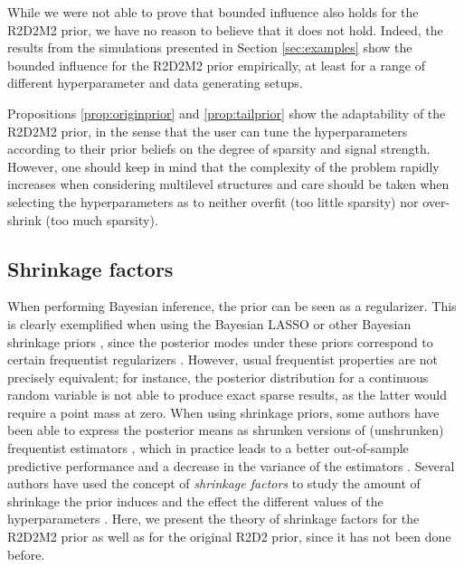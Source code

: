 While we were not able to prove that bounded influence also holds for the R2D2M2 prior, we have no reason to believe that it does not hold. Indeed, the results from the simulations presented in Section \ref{sec:examples} show the bounded influence for the R2D2M2 prior empirically, at least for a range of different hyperparameter and data generating setups.

Propositions \ref{prop:originprior} and \ref{prop:tailprior} show the adaptability of the R2D2M2 prior, in the sense that the user can tune the hyperparameters according to their prior beliefs on the degree of sparsity and signal strength. However, one should keep in mind that the complexity of the problem rapidly increases when considering multilevel structures and care should be taken when selecting the hyperparameters as to neither overfit (too little sparsity) nor over-shrink (too much sparsity).  \\

\subsection{Shrinkage factors}
\label{subsection:shrinkagefactors}

 When performing Bayesian inference, the prior can be seen as a regularizer. This is clearly exemplified when using the Bayesian LASSO or other Bayesian shrinkage priors \citep{bayesianlasso,BayesPenalizedRegSara}, since the posterior modes under these priors correspond to certain frequentist regularizers \citep{DirichletLaplace}. However, usual frequentist properties are not precisely equivalent; for instance, the posterior distribution for a continuous random variable is not able to produce exact sparse results, as the latter would require a point mass at zero. When using shrinkage priors, some authors have been able to express the posterior means as shrunken versions of (unshrunken) frequentist estimators \citep{PiironenHorseshoe}, which in practice leads to a better out-of-sample predictive performance and a decrease in the variance of the estimators \citep{Ridge}. Several authors have used the concept of \emph{shrinkage factors} to study the amount of shrinkage the prior induces and the effect the different values of the hyperparameters \citep{Horseshoe,PiironenHorseshoe, BaiHypothesisNB, PolsonHalfCauchy}. Here, we present the theory of shrinkage factors for the R2D2M2 prior as well as for the original R2D2 prior, since it has not been done before.

